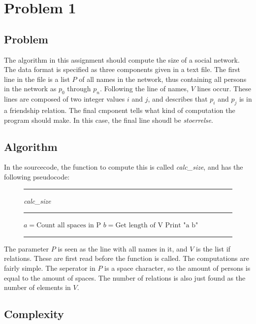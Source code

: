 \section{Problem 1}

\subsection{Problem}

The algorithm in this assignment should compute the size of a
social network. The data format is specified as
three components given in a text file. The first line in the file is
a list $P$ of all names in the network, thus containing all
persons in the network as $p_0$ through $p_n$. Following the line of names, 
$V$ lines occur. These lines are composed of two integer 
values $i$ and $j$, and describes that $p_i$ and $p_j$ is in a friendship 
relation. The final cmponent tells what kind of computation the program should make.
In this case, the final line shoudl be \textit{stoerrelse}.


\subsection{Algorithm}

In the sourcecode, the function to compute this is called \textit{calc\_size},
and has the following pseudocode:

\begin{figure}[ht]
\hrule
\vspace{0.2cm}
{\centering  \textit{calc\_size}}
\vspace{0.2cm}
\hrule
\begin{algorithmic}

\State $a = \text{Count all spaces in P}$
\State $b = \text{Get length of V}$
\State $\text{Print "a b"}$ 
\EndFunction
\end{algorithmic}
\hrule
\end{figure}

The parameter $P$ is seen as the line with all names in it, and
$V$ is the list if relations. These are first read before the 
function is called. The computations are fairly simple. The
seperator in $P$ is a space character, so the amount of 
persons is equal to the amount of spaces. The number of relations
is also just found as the number of elements in $V$.

\subsection{Complexity}

